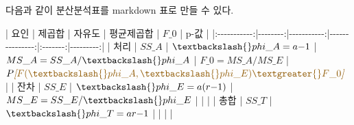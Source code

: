 \documentclass[
]{book}
\newenvironment{Shaded}{\begin{snugshade}}{\end{snugshade}}
\newcommand{\CommentTok}[1]{\textcolor[rgb]{0.56,0.35,0.01}{\textit{#1}}}
\newcommand{\NormalTok}[1]{#1}
\newcommand{\OtherTok}[1]{\textcolor[rgb]{0.56,0.35,0.01}{#1}}
\theoremstyle{definition}
\theoremstyle{definition}
\theoremstyle{definition}
\theoremstyle{definition}
\theoremstyle{remark}
\begin{document}
다음과 같이 분산분석표를 markdown 표로 만들 수 있다.

\begin{Shaded}
\begin{Highlighting}[]
\NormalTok{|   요인     |  제곱합  |   자유도   |  평균제곱합    | $F\_0$   |  p{-}값    |}
\NormalTok{|:{-}{-}{-}{-}{-}{-}{-}{-}{-}{-}{-}:|{-}{-}{-}{-}{-}{-}{-}{-}:|{-}{-}{-}{-}{-}{-}{-}{-}{-}{-}{-}:|{-}{-}{-}{-}{-}{-}{-}{-}{-}{-}{-}{-}{-}{-}{-}:|:{-}{-}{-}{-}{-}{-}{-}:|{-}{-}{-}{-}{-}{-}{-}{-}{-}:|}
\NormalTok{|   처리     |  $SS\_A$ |  $\textbackslash{}phi\_A = a{-}1$  |  $MS\_A=SS\_A/\textbackslash{}phi\_A$       | $F\_0=MS\_A/MS\_E$ |  $P}\CommentTok{[}\OtherTok{F(\textbackslash{}phi\_A, \textbackslash{}phi\_E) \textgreater{} F\_0  }\CommentTok{]}\NormalTok{$       |}
\NormalTok{|   잔차   |  $SS\_E$  |  $\textbackslash{}phi\_E=a(r{-}1)$  |  $MS\_E=SS\_E/\textbackslash{}phi\_E$ |  |       |}
\NormalTok{|  총합   |  $SS\_T$  |  $\textbackslash{}phi\_T =  ar{-}1$        |       |        |         |}
\end{Highlighting}
\end{Shaded}
\end{document}
